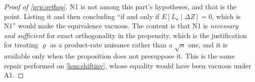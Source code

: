 \begin{proof}[Proof of \cref{prp:orthog}]
N1 is not among this part's hypotheses, and that is the point. Listing it and then concluding
``if and only if $E[L_\star\mid\Delta Z]=0$, which is N1'' would make the equivalence vacuous. The
content is that N1 is \emph{necessary and sufficient} for exact orthogonality in the propensity, 
which is the justification for treating $\varrho$ as a product-rate nuisance rather than a
$\sqrt n$ one, and it is available only when the proposition does not presuppose it. This is the same
repair performed on \cref{lem:shiftinv}, whose equality would have been vacuous under A1.
\end{proof}

%
